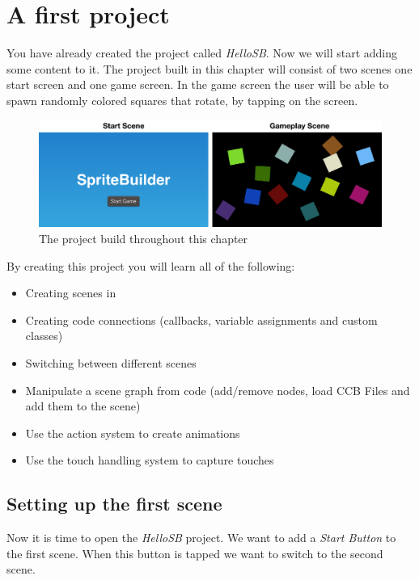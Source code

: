 \section{A first \SB{} project} 
You have already created the \SB{} project called \textit{HelloSB}. Now we will
start adding some content to it. The project built in this chapter will consist
of two scenes one start screen and one game screen. In the game screen the user will be able to spawn randomly
colored squares that rotate, by tapping on the screen.
\begin{figure}[H]
		\centering
		\includegraphics[width=0.9\linewidth]{images/firstproject/first_project.png}
		\caption{The project build throughout this chapter}
\end{figure}
By creating this project you will learn all of the following:
\begin{itemize}
  \item Creating scenes in \SB{}
  \item Creating code connections (callbacks, variable assignments and custom
  classes)
  \item Switching between different scenes
  \item Manipulate a scene graph from code (add/remove nodes, load CCB Files and
  add them to the scene)
  \item Use the \cocos{} action system to create animations
  \item Use the \cocos{} touch handling system to capture touches
\end{itemize}

\subsection{Setting up the first scene}
Now it is time to open the \textit{HelloSB} \SB{} project. We want to add a
\textit{Start Button} to the first scene. When this button is tapped we want to
switch to the second scene. 

